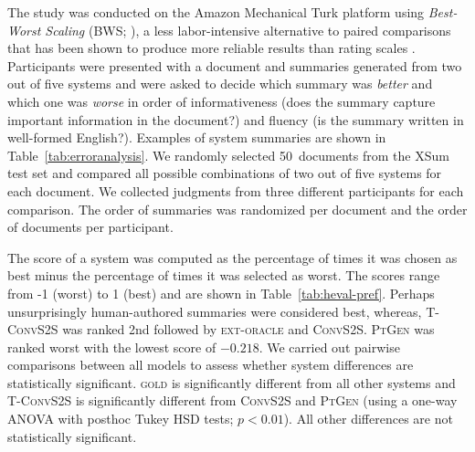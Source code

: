 The study was conducted on the Amazon Mechanical Turk platform using
\textit{Best-Worst Scaling} (BWS; \citealt{louviere1991best,
  louviere2015best}), a less labor-intensive alternative to paired
comparisons that has been shown to produce more reliable results than
rating scales \cite{bestworstscaling}. Participants were presented
with a document and summaries generated from two out of five systems
and were asked to decide which summary was \textit{better} and which one
was \textit{worse} in order of informativeness (does the summary
capture important information in the document?) and fluency (is the
summary written in well-formed English?). Examples of system summaries
are shown in Table~\ref{tab:erroranalysis}.  We randomly selected
50~documents from the XSum test set and compared all possible
combinations of two out of five systems for each document. We
collected judgments from three different participants for each
comparison. The order of summaries was randomized per document and the
order of documents per participant.

\begin{table}[t]
  \caption{System ranking according to human judgments  and QA-based
    evaluation.\label{tab:heval-pref}}
\end{table}

The score of a system was computed as the percentage of times it was
chosen as best minus the percentage of times it was selected as
worst. The scores range from -1 (worst) to 1 (best) and are shown in
Table~\ref{tab:heval-pref}. Perhaps unsurprisingly human-authored
summaries were considered best, whereas, \textsc{T-ConvS2S} was ranked
2nd followed by \textsc{ext-oracle} and
\textsc{ConvS2S}. \textsc{PtGen} was ranked worst with the lowest
score of $-0.218$. We carried out pairwise comparisons between all
models to assess whether system differences are statistically
significant. \textsc{gold} is significantly different from all other
systems and \textsc{T-ConvS2S} is significantly different from
\textsc{ConvS2S} and \textsc{PtGen} (using a one-way ANOVA with
posthoc Tukey HSD tests; $p < 0.01$). All other differences are not
statistically significant.



